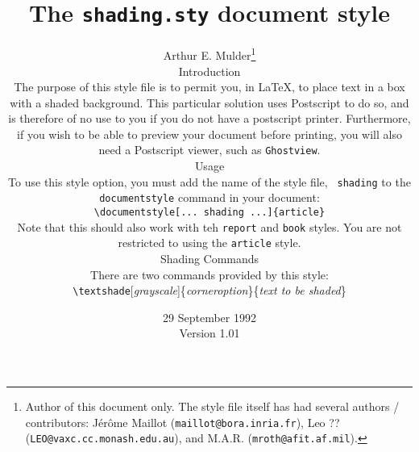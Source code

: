 \title{The {\tt shading.sty} document style}
\author{Arthur E. Mulder\thanks{Author of this document only.  The
  style file itself has had several authors / contributors:
  J\'{e}r\^{o}me Maillot ({\tt maillot@bora.inria.fr}),
  Leo ??  ({\tt LEO@vaxc.cc.monash.edu.au}), and
  M.A.R. ({\tt mroth@afit.af.mil}).}
\date{29 September 1992 \\
Version 1.01}
\maketitle


\section{Introduction}
  The purpose of this style file is to permit you, in LaTeX, to place text
  in a box with a shaded background.  This particular solution uses
  Postscript to do so, and is therefore of no use to you if you do not have
  a postscript printer.  Furthermore, if you wish to be able to preview your
  document before printing, you will also need a Postscript viewer, such as
  {\tt Ghostview}.

\section{Usage}
  To use this style option, you must add the name of the style file, {\tt
  shading} to the {\tt documentstyle} command in your document:

  \begin{quote}
        \verb|\documentstyle[... shading ...]{article}|
  \end{quote}

  Note that this should also work with teh {\tt report} and {\tt book}
  styles.  You are not restricted to using the {\tt article} style.

\subsection{Shading Commands}
  There are two commands provided by this style:

  \begin{quote}
    \verb|\textshade|[{\em grayscale}]\{{\em corneroption}\}\{{\em text
        to be shaded}\}


\end{quote}}
